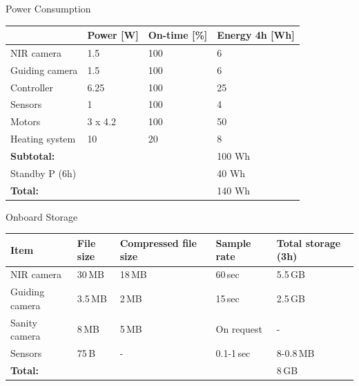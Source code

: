 \documentclass[11pt, aspectratio=169]{beamer}
\begin{document}
\begin{frame}{Power Consumption}
\centering
	\begin{tabular}{| l | l | l | l |}
	\hline
	& \textbf{Power [W]} & \textbf{On-time [\%]} & \textbf{Energy 4h [Wh]} \\\hline\hline
	NIR camera 		& 1.5	 	& 100 & 6 		\\\hline
	Guiding camera 	& 1.5 		& 100 & 6		\\\hline
	Controller 		& 6.25 		& 100 & 25		\\\hline
	Sensors 		& 1			& 100 & 4		\\\hline
	Motors			& 3 x 4.2	& 100 & 50		\\\hline
	Heating system 	& 10		& 20  & 8		\\\hline\hline
	
	\textbf{Subtotal:}& & 			  & 100 Wh  \\\hline\hline
	
	Standby P (6h) 	& & 			  & 40 Wh	\\\hline\hline
	
	\textbf{Total:} & & 			  & 140 Wh	\\\hline
	\end{tabular}
\end{frame}

\begin{frame}[c]{Onboard Storage}
\centering
\hspace*{-.5cm}
\begin{tabular}{| l | l | l | l | l |}
	\hline
	\textbf{Item} & \textbf{File size} & \textbf{Compressed file size} & \textbf{Sample rate} & \textbf{Total storage (3h)} \\\hline\hline
	
	NIR camera		& 30\,MB  & 18\,MB & 60\,sec 	 & 5.5\,GB \\\hline
	Guiding camera	& 3.5\,MB & 2\,MB  & 15\,sec	 & 2.5\,GB \\\hline
	Sanity camera	& 8\,MB   & 5\,MB  & On request  & - \\\hline
	Sensors			& 75\,B   & -      & 0.1-1\,sec  & 8-0.8\,MB \\\hline\hline
	\textbf{Total:} &	   	  &	       &	         & 8\,GB \\\hline
	

\end{tabular}
\end{frame}
\end{document}
